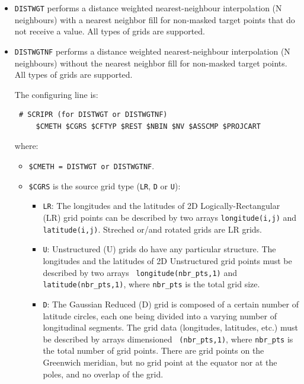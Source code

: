   \begin{itemize}

  \item {\tt DISTWGT} performs a distance weighted nearest-neighbour
    interpolation (N neighbours) with a nearest neighbor fill for non-masked target points
    that do not receive a value. All types of grids are supported.

  \item {\tt DISTWGTNF} performs a distance weighted nearest-neighbour
    interpolation (N neighbours) without the nearest neighbor fill for non-masked target points. 
    All types of grids are supported.

    The configuring line is:

  \begin{verbatim}
 # SCRIPR (for DISTWGT or DISTWGTNF) 
     $CMETH $CGRS $CFTYP $REST $NBIN $NV $ASSCMP $PROJCART
\end{verbatim} 
    where:
    \begin{itemize}
    \item {\tt \$CMETH = DISTWGT or DISTWGTNF}.
    \item {\tt \$CGRS} is the source grid type ({\tt LR}, {\tt D} or
      {\tt U}):
      \begin{itemize}

\item {\tt LR}: The longitudes and the latitudes of
  2D Logically-Rectangular (LR) grid points can be described by two arrays
  {\tt longitude(i,j)} and {\tt latitude(i,j)}. Streched
  or/and rotated grids are LR grids. 

\item {\tt U}: Unstructured (U) grids do have any particular
      structure. The longitudes and the latitudes of 2D Unstructured
      grid points must be described by two arrays {\tt
      longitude(nbr\_pts,1)} and {\tt latitude(nbr\_pts,1)}, where {\tt nbr\_pts}
      is the total grid size.

\item {\tt D}: The Gaussian Reduced (D) grid is composed of a certain
number of latitude circles, each one being divided into a varying
number of longitudinal segments. The grid data (longitudes,
latitudes, etc.) must be described by arrays dimensioned {\tt
(nbr\_pts,1)}, where {\tt nbr\_pts} is the total number of grid
points. There are grid points on the Greenwich meridian, but no grid point at the
equator nor at the poles, and no overlap of the grid.
 

\end{itemize}
\end{itemize}
\end{itemize}
